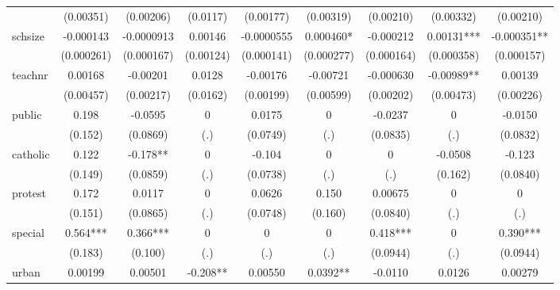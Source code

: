\begin{table}[htbp]
\begin{tabular}{l*{8}{c}}
            &   (0.00351)   &   (0.00206)   &    (0.0117)   &   (0.00177)   &   (0.00319)   &   (0.00210)   &   (0.00332)   &   (0.00210)   \\
[1em]
schsize     &   -0.000143   &  -0.0000913   &     0.00146   &  -0.0000555   &    0.000460*  &   -0.000212   &     0.00131***&   -0.000351** \\
            &  (0.000261)   &  (0.000167)   &   (0.00124)   &  (0.000141)   &  (0.000277)   &  (0.000164)   &  (0.000358)   &  (0.000157)   \\
[1em]
teachnr     &     0.00168   &    -0.00201   &      0.0128   &    -0.00176   &    -0.00721   &   -0.000630   &    -0.00989** &     0.00139   \\
            &   (0.00457)   &   (0.00217)   &    (0.0162)   &   (0.00199)   &   (0.00599)   &   (0.00202)   &   (0.00473)   &   (0.00226)   \\
[1em]
public      &       0.198   &     -0.0595   &           0   &      0.0175   &           0   &     -0.0237   &           0   &     -0.0150   \\
            &     (0.152)   &    (0.0869)   &         (.)   &    (0.0749)   &         (.)   &    (0.0835)   &         (.)   &    (0.0832)   \\
[1em]
catholic    &       0.122   &      -0.178** &           0   &      -0.104   &           0   &           0   &     -0.0508   &      -0.123   \\
            &     (0.149)   &    (0.0859)   &         (.)   &    (0.0738)   &         (.)   &         (.)   &     (0.162)   &    (0.0840)   \\
[1em]
protest     &       0.172   &      0.0117   &           0   &      0.0626   &       0.150   &     0.00675   &           0   &           0   \\
            &     (0.151)   &    (0.0865)   &         (.)   &    (0.0748)   &     (0.160)   &    (0.0840)   &         (.)   &         (.)   \\
[1em]
special     &       0.564***&       0.366***&           0   &           0   &           0   &       0.418***&           0   &       0.390***\\
            &     (0.183)   &     (0.100)   &         (.)   &         (.)   &         (.)   &    (0.0944)   &         (.)   &    (0.0944)   \\
[1em]
urban       &     0.00199   &     0.00501   &      -0.208** &     0.00550   &      0.0392** &     -0.0110   &      0.0126   &     0.00279   \\

\end{tabular}
\end{table}
